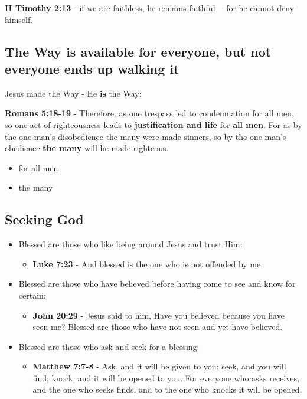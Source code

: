 \documentclass[11pt]{article}
\begin{document}
\textbf{II Timothy 2:13} - if we are faithless, he remains faithful— for he cannot deny himself.

\subsection{The Way is available for everyone, but not everyone ends up walking it}
\label{sec:orge0a739f}
Jesus made the Way - He \textbf{is} the Way:

\textbf{Romans 5:18-19} - Therefore, as one trespass led to condemnation for all men, so one act of righteousness \uline{leads to} \textbf{justification and life} for \textbf{all men}. For as by the one man's disobedience the many were made sinners, so by the one man's obedience \textbf{the many} will be made righteous.

\begin{itemize}
\item for all men
\item the many
\end{itemize}

\subsection{Seeking God}
\label{sec:org6a6ea87}
\begin{itemize}
\item Blessed are those who like being around Jesus and trust Him:
\begin{itemize}
\item \textbf{Luke 7:23} - And blessed is the one who is not offended by me.
\end{itemize}

\item Blessed are those who have believed before having come to see and know for certain:
\begin{itemize}
\item \textbf{John 20:29} - Jesus said to him, Have you believed because you have seen me? Blessed are those who have not seen and yet have believed.􇩙
\end{itemize}

\item Blessed are those who ask and seek for a blessing:
\begin{itemize}
\item \textbf{Matthew 7:7-8} - Ask, and it will be given to you; seek, and you will find; knock, and it will be opened to you. For everyone who asks receives, and the one who seeks finds, and to the one who knocks it will be opened.
\end{itemize}
\end{itemize}
\end{document}
